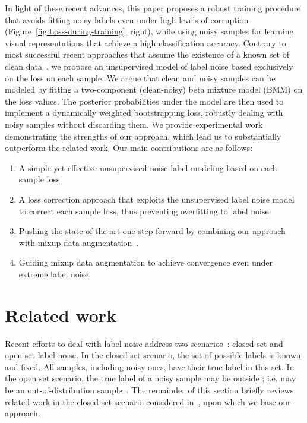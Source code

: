 \documentclass{article}
\begin{document}
In light of these recent advances, this paper proposes a robust training
procedure that avoids fitting noisy labels even under high levels
of corruption (Figure~\ref{fig:Loss-during-training}, right), while
using noisy samples for learning visual representations that achieve
a high classification accuracy. Contrary to most successful recent
approaches that assume the existence of a known set of clean data~\cite{2018_ICML_L2ReweightNoise,2018_NIPS_GoldLoss},
we propose an unsupervised model of label noise based exclusively
on the loss on each sample. We argue that clean and noisy samples
can be modeled by fitting a two-component (clean-noisy) beta mixture
model (BMM) on the loss values. The posterior probabilities under
the model are then used to implement a dynamically weighted bootstrapping
loss, robustly dealing with noisy samples without discarding them.
We provide experimental work demonstrating the strengths
of our approach, which lead us to substantially outperform the related
work. Our main contributions are as follows: 
\begin{enumerate}
\item A simple yet effective unsupervised noise label modeling based on
each sample loss. 
\item A loss correction approach that exploits the unsupervised label noise
model to correct each sample loss, thus preventing overfitting to
label noise. 
\item Pushing the state-of-the-art one step forward by combining our approach
with mixup data augmentation~\cite{2018_ICLR_mixup}.
\item Guiding mixup data augmentation to achieve convergence even under
extreme label noise.
\end{enumerate}

\section{Related work}

Recent efforts to deal with label noise address two scenarios~\cite{2018_CVPR_IterativeNoise}:
closed-set and open-set label noise. In the closed set scenario, the
set of possible labels  is known and fixed. All samples, including
noisy ones, have their true label in this set. In the open set scenario,
the true label of a noisy sample  may be outside ; i.e.
 may be an out-of-distribution sample~\cite{2018_ICLR_OutOfDist}.
The remainder of this section briefly reviews related work in the
closed-set scenario considered in~\cite{2017_ICLR_Rethinking}, upon
which we base our approach.
\end{document}
